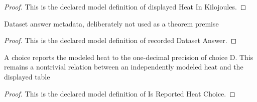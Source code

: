 \begin{proof}
  This is the declared model definition of displayed Heat In Kilojoules.
\end{proof}
\begin{definition}
  \label{def:physics:phyx-mini-0451:phyxminiproblems-problemphyxmini0451-recordeddatasetanswer}
  Dataset answer metadata, deliberately not used as a theorem premise
\end{definition}
\begin{proof}
  This is the declared model definition of recorded Dataset Answer.
\end{proof}
\begin{definition}
  \label{def:physics:phyx-mini-0451:phyxminiproblems-problemphyxmini0451-isreportedheatchoice}
  A choice reports the modeled heat to the one-decimal precision of choice D. This remains a nontrivial relation between an independently modeled heat and the displayed table
\end{definition}
\begin{proof}
  This is the declared model definition of Is Reported Heat Choice.
\end{proof}
